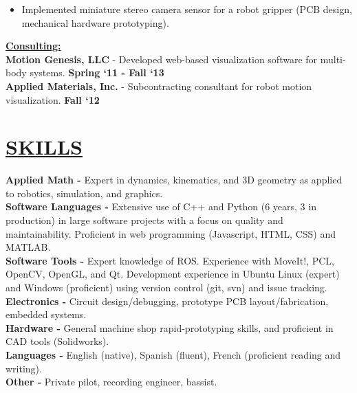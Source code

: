 \documentclass[line,margin]{res}
\newenvironment{compactlist}{
	\begin{itemize}\itemsep=0pt
}{
	\end{itemize}
}
\newcommand{\CVOnly}[1]{}
\newcommand{\CVOnly}[1]{#1}
\newcommand{\hide}[1]{}
\begin{document}
\begin{resume}
\begin{compactlist}
\item Implemented miniature stereo camera sensor for a robot gripper (PCB design, mechanical hardware prototyping).
\end{compactlist}
%
\CVOnly{
{\bf Electrical Engineering Intern} - Qual-Tron, Inc., Tulsa, OK \hfill \textbf{March `06 - Feb. `07}
\begin{compactlist}
\item Designed and implemented test procedures for IR and magnetic sensor products.
\item Led redesign of a magnetic sensor product to reduce cost and simplify assembly.
\end{compactlist}
}
%
\hide{
\\[0.4pc]{\bf Summer Intern} - Atmel Corporation \hfill \textbf{Summer `05}
\\[0.4pc]{\bf Summer Research Intern} - NASA Glenn Research Center \hfill \textbf{Summer `04}%
}
%
{\bf \underline{Consulting:}}
\\[0.2pc]{\bf Motion Genesis, LLC} - Developed web-based visualization software for multi-body systems. \hfill \textbf{Spring `11 - Fall `13}%
{\\[0.0pc]{\bf Applied Materials, Inc.} - Subcontracting consultant for robot motion visualization. \hfill \textbf{Fall `12}}%
\CVOnly{\\[0.0pc]{\bf Charm Labs} - Dynamics and control. Confidential. \hfill \textbf{Summer `12}}%
%
%
\section{\underline{SKILLS}}
\vspace{1.0pc}
\textbf{Applied Math - } Expert in dynamics, kinematics, and 3D geometry as applied to robotics, simulation, and graphics.
\\[0.0pc]\textbf{Software Languages - } Extensive use of C++ and Python (6 years, 3 in production) in large software projects with a focus on quality and maintainability. Proficient in web programming (Javascript, HTML, CSS) and MATLAB.
\\[0.0pc]\textbf{Software Tools - } Expert knowledge of ROS. Experience with MoveIt!, PCL, OpenCV, OpenGL, and Qt.
Development experience in Ubuntu Linux (expert) and Windows (proficient) using version control (git, svn) and issue tracking. %
\\[0.0pc]\textbf{Electronics - } Circuit design/debugging, prototype PCB layout/fabrication, embedded systems.
\\[0.0pc]\textbf{Hardware - } General machine shop rapid-prototyping skills, and proficient in CAD tools (Solidworks).
\\[0.0pc]\textbf{Languages - } English (native), Spanish (fluent), French (proficient reading and writing).
\\[0.0	pc]\textbf{Other - } Private pilot, recording engineer, bassist.
%
%

\end{resume}
\end{document}
